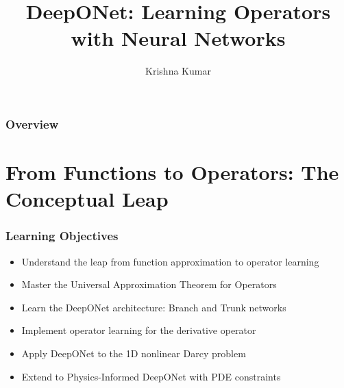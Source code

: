 \documentclass[notes]{beamer}
\title[DeepONet: Operator Learning]{DeepONet: Learning Operators with Neural Networks}
\author{Krishna Kumar} %
\institute[UT Austin] %
{
University of Texas at Austin \\
\medskip
\textit{
  \url{krishnak@utexas.edu}} %
}
\date{} %
\begin{document}
\begin{frame}
\titlepage %
\end{frame}

\begin{frame}
 \frametitle{Overview}
 \tableofcontents
\end{frame}


\section{From Functions to Operators: The Conceptual Leap}

\begin{frame}
\frametitle{Learning Objectives}

\begin{itemize}
    \item Understand the leap from function approximation to operator learning
    \item Master the Universal Approximation Theorem for Operators
    \item Learn the DeepONet architecture: Branch and Trunk networks
    \item Implement operator learning for the derivative operator
    \item Apply DeepONet to the 1D nonlinear Darcy problem
    \item Extend to Physics-Informed DeepONet with PDE constraints
\end{itemize}

\vspace{1cm}
\centering
\href{https://colab.research.google.com/github/kks32-courses/ut-portugal-sciml/blob/main/docs/02-deeponet/deeponet.ipynb}{}

\vspace{0.5cm}
\href{https://colab.research.google.com/github/kks32-courses/ut-portugal-sciml/blob/main/docs/02-deeponet/pideeponet.ipynb}{}

\end{frame}
\end{document}
